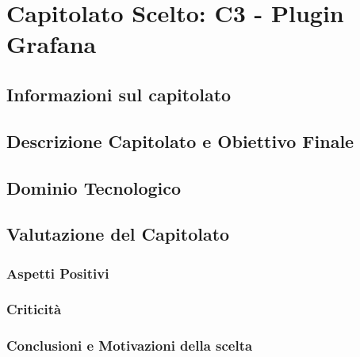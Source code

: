 \section{Capitolato Scelto: C3 - Plugin Grafana}

\subsection{Informazioni sul capitolato}

\subsection{Descrizione Capitolato e Obiettivo Finale}

\subsection{Dominio Tecnologico}

\subsection{Valutazione del Capitolato}

\subsubsection{Aspetti Positivi}

\subsubsection{Criticità}

\subsubsection{Conclusioni e Motivazioni della scelta}